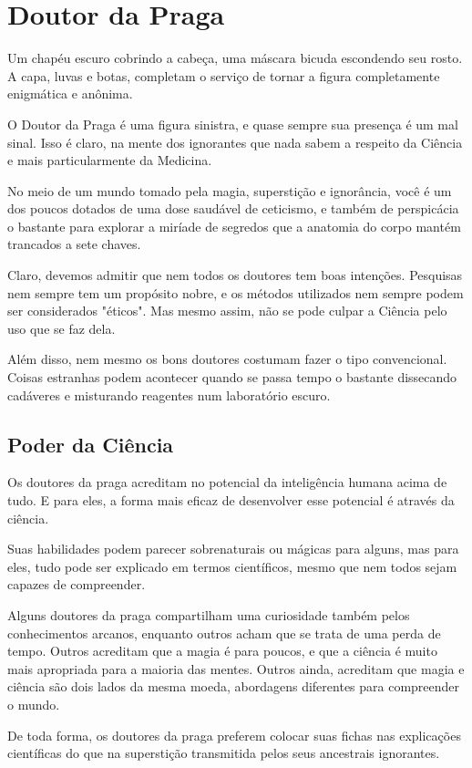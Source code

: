 \documentclass[letterpaper,twocolumn,openany]{dndbook}
\begin{document}
	\section{Doutor da Praga}
	Um chapéu escuro cobrindo a cabeça, uma máscara bicuda escondendo seu rosto. A capa, luvas e botas, completam o serviço de tornar a figura completamente enigmática e anônima.
	
	O Doutor da Praga é uma figura sinistra, e quase sempre sua presença é um mal sinal. Isso é claro, na mente dos ignorantes que nada sabem a respeito da Ciência e mais particularmente da Medicina.
	
	No meio de um mundo tomado pela magia, superstição e  ignorância, você é um dos poucos dotados de uma dose saudável de ceticismo, e também de perspicácia o bastante para explorar a miríade de segredos que a anatomia do corpo mantém trancados a sete chaves.
	
	Claro, devemos admitir que nem todos os doutores tem boas intenções. Pesquisas nem sempre tem um propósito nobre, e os métodos utilizados nem sempre podem ser considerados "éticos". Mas mesmo assim, não se pode culpar a Ciência pelo uso que se faz dela.
	
	Além disso, nem mesmo os bons doutores costumam fazer o tipo convencional. Coisas estranhas podem acontecer quando se passa tempo o bastante dissecando cadáveres e misturando reagentes num laboratório escuro.
	
	\subsection{Poder da Ciência}
	Os doutores da praga acreditam no potencial da inteligência humana acima de tudo. E para eles, a forma mais eficaz de desenvolver esse potencial é através da ciência.
	
	Suas habilidades podem parecer sobrenaturais ou mágicas para alguns, mas para eles, tudo pode ser explicado em termos científicos, mesmo que nem todos sejam capazes de compreender.
	
	Alguns doutores da praga compartilham uma curiosidade também pelos conhecimentos arcanos, enquanto outros acham que se trata de uma perda de tempo. Outros acreditam que a magia é para poucos, e que a ciência é muito mais apropriada para a maioria das mentes. Outros ainda, acreditam que magia e ciência são dois lados da mesma moeda, abordagens diferentes para compreender o mundo.
	
	De toda forma, os doutores da praga preferem colocar suas fichas nas explicações científicas do que na superstição transmitida pelos seus ancestrais ignorantes.
\end{document}
